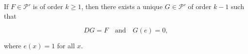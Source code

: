 If $F \in \mathcal{P}'$ is of order $k \geq 1$, then there exists a unique $G \in \mathcal{P}'$ of order $k - 1$ such that

$$DG = F \quad \text{and} \quad G(e) = 0,$$

where $e(x) = 1$ for all $x$.
